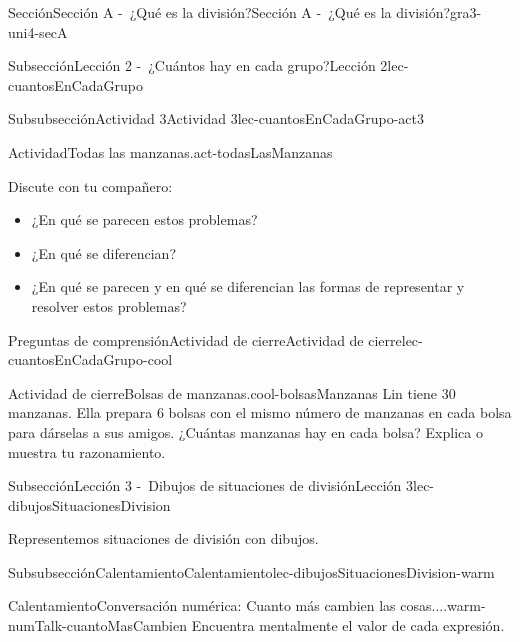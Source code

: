 \documentclass[twoside,10pt,]{article}
\begin{document}
\begin{sectionptx}{Sección}{Sección A -~¿Qué es la división?}{}{Sección A -~¿Qué es la división?}{}{}{gra3-uni4-secA}
\begin{subsectionptx}{Subsección}{Lección 2 -~¿Cuántos hay en cada grupo?}{}{Lección 2}{}{}{lec-cuantosEnCadaGrupo}
\begin{subsubsectionptx}{Subsubsección}{Actividad 3}{}{Actividad 3}{}{}{lec-cuantosEnCadaGrupo-act3}
\begin{activity}{Actividad}{Todas las manzanas.}{act-todasLasManzanas}
\par
Discute con tu compañero:%
\par
%
\begin{itemize}[label=\textbullet]
\item{}¿En qué se parecen estos problemas?%
\item{}¿En qué se diferencian?%
\item{}¿En qué se parecen y en qué se diferencian las formas de representar y resolver estos problemas?%
\end{itemize}
%
\end{activity}%
\end{subsubsectionptx}
%
%
\typeout{************************************************}
\typeout{************************************************}
%
\begin{reading-questions-subsubsection}{Preguntas de comprensión}{Actividad de cierre}{}{Actividad de cierre}{}{}{lec-cuantosEnCadaGrupo-cool}
\begin{project}{Actividad de cierre}{Bolsas de manzanas.}{cool-bolsasManzanas}%
Lin tiene 30 manzanas. Ella prepara 6 bolsas con el mismo número de manzanas en cada bolsa para dárselas a sus amigos. ¿Cuántas manzanas hay en cada bolsa? Explica o muestra tu razonamiento.%
\end{project}%
\end{reading-questions-subsubsection}
\end{subsectionptx}
%
%
\typeout{************************************************}
\typeout{************************************************}
%
\begin{subsectionptx}{Subsección}{Lección 3 -~Dibujos de situaciones de división}{}{Lección 3}{}{}{lec-dibujosSituacionesDivision}
\begin{introduction}{}%
Representemos situaciones de división con dibujos.%
\end{introduction}%
%
%
\typeout{************************************************}
\typeout{************************************************}
%
\begin{subsubsectionptx}{Subsubsección}{Calentamiento}{}{Calentamiento}{}{}{lec-dibujosSituacionesDivision-warm}
\begin{exploration}{Calentamiento}{Conversación numérica: Cuanto más cambien las cosas....}{warm-numTalk-cuantoMasCambien}%
Encuentra mentalmente el valor de cada expresión.%

\end{exploration}
\end{subsubsectionptx}
\end{subsectionptx}
\end{sectionptx}
\end{document}

